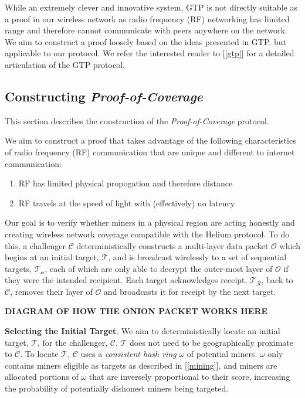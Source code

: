 \documentclass[letterpaper,11pt]{article}
\def\proofofcoverage/{\textit{Proof-of-Coverage}}
\begin{document}
While an extremely clever and innovative system, GTP is not directly suitable as a proof in our wireless network as radio frequency (RF) networking has limited range and therefore cannot communicate with peers anywhere on the network. We aim to construct a proof loosely based on the ideas presented in GTP, but applicable to our protocol. We refer the interested reader to [\ref{gtp}] for a detailed articulation of the GTP protocol.

\subsection{Constructing \proofofcoverage/}

This section describes the construction of the \proofofcoverage/ protocol.\newline

We aim to construct a proof that takes advantage of the following characteristics of radio frequency (RF) communication that are unique and different to internet communication:

\begin{enumerate}
	\item RF has limited physical propogation and therefore distance
	\item RF travels at the speed of light with (effectively) no latency
\end{enumerate}

Our goal is to verify whether miners in a physical region are acting honestly and creating wireless network coverage compatible with the Helium protocol. To do this, a challenger $\mathcal{C}$ deterministically constructs a multi-layer data packet $\mathcal{O}$ which begins at an initial target, $\mathcal{T}$, and is broadcast wirelessly to a set of sequential targets, $\mathcal{T_n}$, each of which are only able to decrypt the outer-most layer of $\mathcal{O}$ if they were the intended recipient. Each target acknowledges receipt, $\mathcal{T_R}$, back to $\mathcal{C}$, removes their layer of $\mathcal{O}$ and broadcasts it for receipt by the next target. \newline

\textbf{DIAGRAM OF HOW THE ONION PACKET WORKS HERE}\newline

\textbf{Selecting the Initial Target}. We aim to deterministically locate an initial target, $\mathcal{T}$, for the challenger, $\mathcal{C}$. $\mathcal{T}$ does not need to be geographically proximate to $\mathcal{C}$. To locate $\mathcal{T}$, $\mathcal{C}$ uses a \textit{consistent hash ring} $\mathcal{\omega}$ of potential miners. $\mathcal{\omega}$ only contains miners eligible as targets as described in [\ref{mining}], and miners are allocated portions of $\mathcal{\omega}$ that are inversely proportional to their score, increasing the probability of potentially dishonest miners being targeted.\newline
\end{document}
